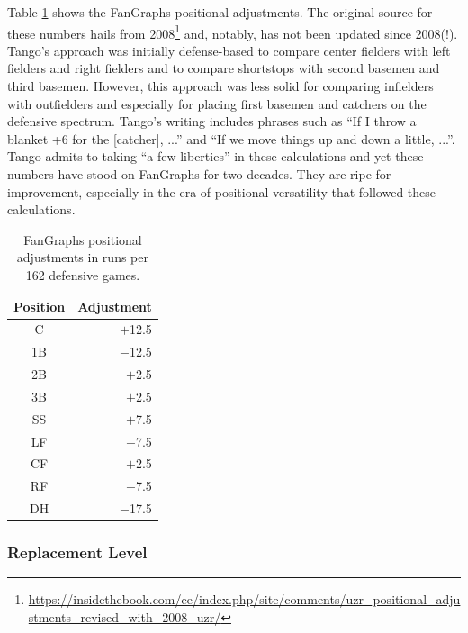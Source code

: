 \documentclass{article}
\begin{document}
        Table \ref{tab:positional-adjustment} shows the FanGraphs positional adjustments. The original source for these numbers hails from 2008\footnote{\url{https://insidethebook.com/ee/index.php/site/comments/uzr\_positional\_adjustments\_revised\_with\_2008\_uzr/}} and, notably, has not been updated since 2008(!). Tango's approach was initially defense-based to compare center fielders with left fielders and right fielders and to compare shortstops with second basemen and third basemen. However, this approach was less solid for comparing infielders with outfielders and especially for placing first basemen and catchers on the defensive spectrum. Tango's writing includes phrases such as ``If I throw a blanket +6 for the [catcher], ...'' and ``If we move things up and down a little, ...''. Tango admits to taking ``a few liberties'' in these calculations and yet these numbers have stood on FanGraphs for two decades. They are ripe for improvement, especially in the era of positional versatility that followed these calculations.

        \begin{table}
          \begin{center}
            \begin{tabular}{cr}
              Position & Adjustment\\
              \hline
              C  & $+$12.5\\
              1B & $-$12.5\\
              2B & $+$2.5\\
              3B & $+$2.5\\
              SS & $+$7.5\\
              LF & $-$7.5\\
              CF & $+$2.5\\
              RF & $-$7.5\\
              DH & $-$17.5\\
            \end{tabular}
          \end{center}
          \caption{FanGraphs positional adjustments in runs per 162 defensive games.}
          \label{tab:positional-adjustment}
        \end{table}

      \subsubsection{\sc Replacement Level}
\end{document}
